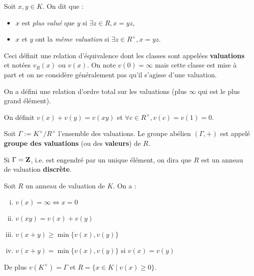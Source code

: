 	\begin{defn}
		Soit $x, y \in K$. On dit que :
		\begin{itemize}
			\item[\textbullet] $x$ est \textit{plus valué} que $y$ si $\exists z \in R, x = yz$,
			\item[\textbullet] $x$ et $y$ ont la  \textit{même valuation} si $\exists z \in R^\times, x = yz$.
		\end{itemize}
		Ceci définit une relation d'équivalence dont les classes sont appelées \textbf{valuations} et notées $v_R(x)$ ou $v(x)$.
		On note $v(0) = \infty$ mais cette classe est mise à part et on ne considère généralement pas qu'il s'agisse d'une valuation.
	\end{defn}

	\begin{rem}
		On a défini une relation d'ordre total sur les valuations (plus $\infty$ qui est le plus grand élément).
	\end{rem}

	\begin{note}
		On définit $v(x) + v(y) = v(xy)$ et $\forall c \in R^\times, v(c) = v(1) = 0$.
	\end{note}

	\begin{defn}
		Soit $\Gamma := K^\times / R^\times$ l'ensemble des valuations.
		Le groupe abélien $(\Gamma, +)$ est appelé \textbf{groupe des valuations} (ou des \textbf{valeurs}) de $R$.
	\end{defn}

	\begin{defn}
		Si $\Gamma = \mathbf{Z}$, i.e. est engendré par un unique élément, on dira que $R$ est un anneau de valuation \textbf{discrète}.
	\end{defn}

	\begin{pop}
		Soit $R$ un anneau de valuation de $K$. On a :
		\begin{enumerate}[(i)]
			\item $v(x) = \infty \iff x = 0$
			\item $v(xy) = v(x) + v(y)$
			\item $v(x + y) \geq \min \{ v(x), v(y) \}$
			\item $v(x + y) = \min \{ v(x), v(y) \}$ si $v(x) = v(y)$
		\end{enumerate}
		De plus $v(K^\times) = \Gamma$ et $R = \{ x \in K \mid v(x) \geq 0 \}$.
	\end{pop}

